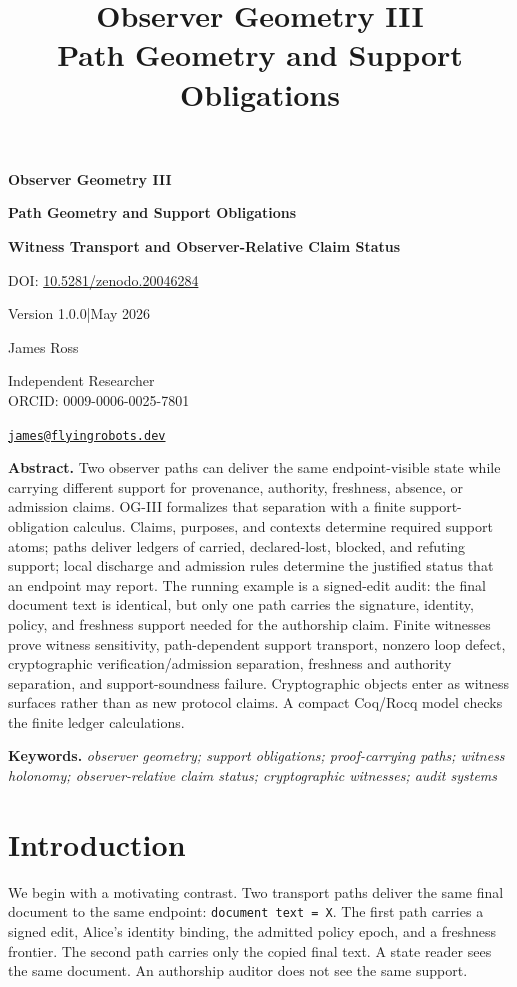 \documentclass[11pt,twoside]{article}
\title{Observer Geometry III\\\large Path Geometry and Support Obligations}
\author{}
\date{}
\newcommand{\paperdoi}{DOI: \href{https://doi.org/10.5281/zenodo.20046284}{10.5281/zenodo.20046284}}
\newcommand{\paperversion}{Version 1.0.0}
\newcommand{\publicationdate}{May 2026}
\theoremstyle{definition}
\newcommand{\paperkeywords}{observer geometry; support obligations; proof-carrying paths; witness holonomy; observer-relative claim status; cryptographic witnesses; audit systems}
\newcommand{\paperabstract}{Two observer paths can deliver the same endpoint-visible state while carrying different support for provenance, authority, freshness, absence, or admission claims. OG-III formalizes that separation with a finite support-obligation calculus. Claims, purposes, and contexts determine required support atoms; paths deliver ledgers of carried, declared-lost, blocked, and refuting support; local discharge and admission rules determine the justified status that an endpoint may report. The running example is a signed-edit audit: the final document text is identical, but only one path carries the signature, identity, policy, and freshness support needed for the authorship claim. Finite witnesses prove witness sensitivity, path-dependent support transport, nonzero loop defect, cryptographic verification/admission separation, freshness and authority separation, and support-soundness failure. Cryptographic objects enter as witness surfaces rather than as new protocol claims. A compact Coq/Rocq model checks the finite ledger calculations.}
\begin{document}
\begingroup
\thispagestyle{ogtitle}
\begin{center}
\vspace*{-0.03\textheight}
{\fontsize{28}{32}\selectfont\bfseries{}\selectfont Observer Geometry III\par}
{\fontsize{24}{28}\selectfont\bfseries{} Path Geometry and Support Obligations\par}
\vspace{0.20em}
{\Large\bfseries Witness Transport and Observer-Relative Claim Status\par}
\vspace{0.18em}
{\normalsize \paperdoi\\[-0.22em]}
{\normalsize \paperversion\enspace|\enspace\publicationdate\par}
\vspace{0.48em}
{\large James Ross\par}
{\normalsize Independent Researcher\\[-0.14em]}
{\normalsize ORCID: 0009-0006-0025-7801\\[-0.14em]}
{\normalsize \href{mailto:james@flyingrobots.dev}{\texttt{james@flyingrobots.dev}}\par}
\vspace{0.85em}
\begin{minipage}{0.82\textwidth}
\small
\textbf{Abstract.} \paperabstract
\par
\vspace{1.25em}

\textbf{Keywords.} \textit{\paperkeywords}
\end{minipage}
\end{center}
\endgroup

\clearpage
\begingroup
{}
\setlength{\parskip}{0pt}
\tableofcontents
\endgroup
\clearpage

\section{Introduction}
\label{sec:introduction}

We begin with a motivating contrast.
Two transport paths deliver the same final document to the same endpoint:
\texttt{document text = X}. The first path carries a signed edit, Alice's
identity binding, the admitted policy epoch, and a freshness frontier. The
second path carries only the copied final text. A state reader sees the same
document. An authorship auditor does not see the same support.
\end{document}

